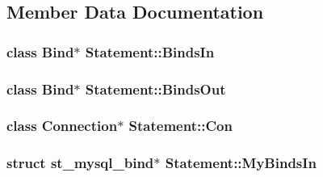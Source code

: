 \subsection{Member Data Documentation}
\hypertarget{class_statement_a2909234df7aef1d8106e56ffd4173348}{}
\subsubsection[{Binds\+In}]{\setlength{\rightskip}{0pt plus 5cm}class {\bf Bind}$\ast$ Statement\+::\+Binds\+In\hspace{0.3cm}{\ttfamily [protected]}}\label{class_statement_a2909234df7aef1d8106e56ffd4173348}
\hypertarget{class_statement_ab7945c474d620d606aa5a1fe42d67e69}{}
\subsubsection[{Binds\+Out}]{\setlength{\rightskip}{0pt plus 5cm}class {\bf Bind}$\ast$ Statement\+::\+Binds\+Out\hspace{0.3cm}{\ttfamily [protected]}}\label{class_statement_ab7945c474d620d606aa5a1fe42d67e69}
\hypertarget{class_statement_a6d0ec1140215c6d723155ec16e0c4227}{}
\subsubsection[{Con}]{\setlength{\rightskip}{0pt plus 5cm}class {\bf Connection}$\ast$ Statement\+::\+Con\hspace{0.3cm}{\ttfamily [protected]}}\label{class_statement_a6d0ec1140215c6d723155ec16e0c4227}
\hypertarget{class_statement_aba9c9b66e160d22b83499dffbe553ab4}{}
\subsubsection[{My\+Binds\+In}]{\setlength{\rightskip}{0pt plus 5cm}struct st\+\_\+mysql\+\_\+bind$\ast$ Statement\+::\+My\+Binds\+In\hspace{0.3cm}{\ttfamily [protected]}}\label{class_statement_aba9c9b66e160d22b83499dffbe553ab4}
\hypertarget{class_statement_ab9e7e021c560025ec51bc8b7570e6f99}{}

